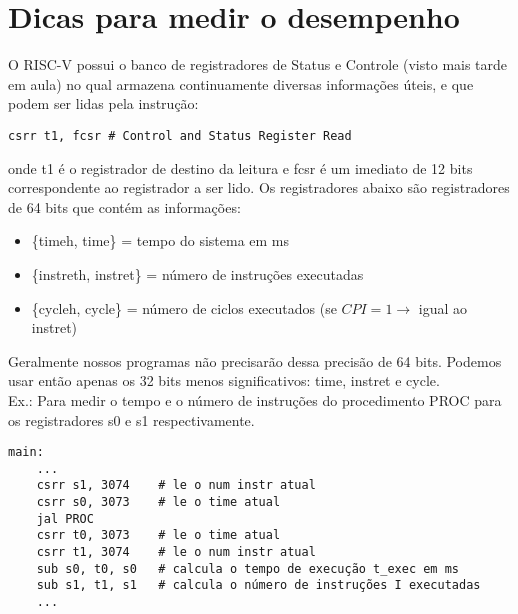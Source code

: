 \documentclass{article}
\begin{document}
\section*{Dicas para medir o desempenho}
O RISC-V possui o banco de registradores de Status e Controle (visto mais tarde em aula) no qual armazena continuamente diversas informações úteis, e que podem ser lidas pela instrução:
\begin{verbatim}
csrr t1, fcsr # Control and Status Register Read
\end{verbatim}
onde t1 é o registrador de destino da leitura e fcsr é um imediato de 12 bits correspondente ao registrador a ser lido.
Os registradores abaixo são registradores de 64 bits que contém as informações:
\begin{itemize}
    \item \{timeh, time\} = tempo do sistema em ms
    \item \{instreth, instret\} = número de instruções executadas
    \item \{cycleh, cycle\} = número de ciclos executados (se $CPI=1 \rightarrow$ igual ao instret)
\end{itemize}
Geralmente nossos programas não precisarão dessa precisão de 64 bits. Podemos usar então apenas os 32 bits menos significativos: time, instret e cycle. \\
Ex.: Para medir o tempo e o número de instruções do procedimento PROC para os registradores s0 e s1 respectivamente.
\begin{verbatim}
main:
    ...
    csrr s1, 3074    # le o num instr atual
    csrr s0, 3073    # le o time atual
    jal PROC
    csrr t0, 3073    # le o time atual
    csrr t1, 3074    # le o num instr atual
    sub s0, t0, s0   # calcula o tempo de execução t_exec em ms
    sub s1, t1, s1   # calcula o número de instruções I executadas
    ...
\end{verbatim}
\end{document}
